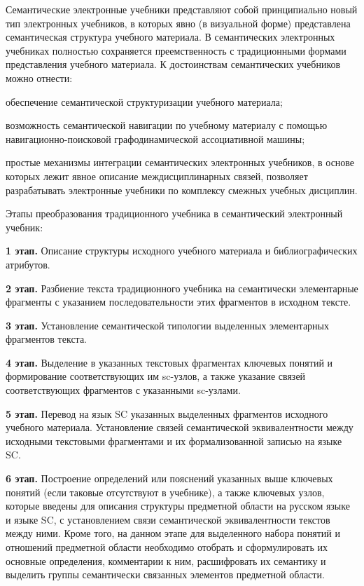 Семантические электронные учебники представляют собой принципиально новый тип электронных учебников, в которых явно (в визуальной форме) представлена семантическая структура учебного материала. В семантических электронных учебниках полностью сохраняется преемственность с традиционными формами представления учебного материала. К достоинствам семантических учебников можно отнести:

\begin{textitemize}
	\item
	обеспечение семантической структуризации учебного материала;
	\item
	возможность семантической навигации по учебному материалу с помощью навигационно-поисковой графодинамической ассоциативной машины;
	\item
	простые механизмы интеграции семантических электронных учебников, в основе которых лежит явное описание междисциплинарных связей, позволяет разрабатывать электронные учебники по комплексу смежных учебных дисциплин.
\end{textitemize}

Этапы преобразования традиционного учебника в семантический электронный учебник:

\textbf{1 этап.} Описание структуры исходного учебного материала и библиографических атрибутов.

\textbf{2 этап.} Разбиение текста традиционного учебника на семантически элементарные фрагменты с указанием последовательности этих фрагментов в исходном тексте.

\textbf{3 этап.} Установление семантической типологии выделенных элементарных фрагментов текста.

\textbf{4 этап.} Выделение в указанных текстовых фрагментах ключевых понятий и формирование соответствующих им sc-узлов, а также указание связей соответствующих фрагментов с указанными sc-узлами.

\textbf{5 этап.} Перевод на язык SC указанных выделенных фрагментов исходного учебного материала. Установление связей семантической эквивалентности между исходными текстовыми фрагментами и их формализованной записью на языке SC.

\textbf{6 этап.} Построение определений или пояснений указанных выше ключевых понятий (если таковые отсутствуют в учебнике), а также ключевых узлов, которые введены для описания структуры предметной области на русском языке и языке SC, с установлением связи семантической эквивалентности текстов между ними. Кроме того, на данном этапе для выделенного набора понятий и отношений предметной области необходимо отобрать и сформулировать их основные определения, комментарии к ним, расшифровать их семантику и выделить группы семантически связанных элементов предметной области.

